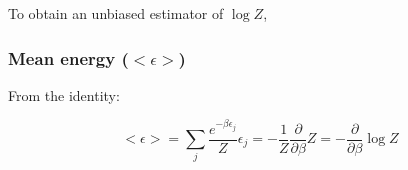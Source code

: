 \documentclass{article}
\newcommand{\ep}{\epsilon}
\begin{document}
To obtain an unbiased estimator of $\log Z$, 
\subsubsection{Mean energy ($<\ep>$)}

From the identity:

\begin{equation}
  \label{eq:dbdz}
  <\ep>=\sum_j\frac{e^{-\beta\ep_j}}{Z}\ep_j = -\frac{1}{Z}\frac{\partial}{\partial\beta}Z = -\frac{\partial}{\partial\beta}\log Z
\end{equation}



{}  \newpage
\end{document}
